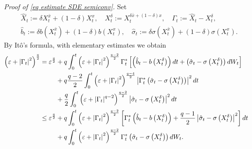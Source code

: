 \documentclass[11pt]{amsart}
\theoremstyle{plain}
\def \dd{{\rm d}}
\numberwithin{equation}{section}
\begin{document}
\smallbreak \noindent
\emph{Proof of \eqref{eq estimate SDE semiconv}.}
Set
$$
\begin{aligned}
& \hat{X}_{t}:=\delta X_{t}^{\bar{x}}+(1-\delta) X_{t}^{x}, \quad X_{t}^{\delta}:=X_{t}^{\delta \bar{x}+(1-\delta) x}, \quad \Gamma_{t}:=\hat{X}_{t}-X_{t}^{\delta}, \\
& \hat{b}_{t}:=\delta b\left(X_{t}^{\bar{x}}\right)+(1-\delta) b\left(X_{t}^{x}\right), \quad 
\hat{\sigma}_{t}:=\delta \sigma\left(X_{t}^{\bar{x}}\right)+(1-\delta) \sigma\left(X_{t}^{x}\right).
\end{aligned}
$$
By It\^o's formula, with elementary estimates we obtain 
$$
\begin{aligned}
\left(\varepsilon+\left|\Gamma_{t}\right|^{2}\right)^{\frac{q}{2}}=\varepsilon^{\frac{q}{2}} 
& 
+q\int_{0}^{t}\left(\varepsilon+\left|\Gamma_{t}\right|^{2}\right)^{\frac{q-2}{2}} \Gamma_{t}^{*}\left[\left(\hat{b}_{t}-b\left(X_t^\delta\right)\right) \dd t+\left(\hat{\sigma}_{t}-\sigma\left(X_t^\delta\right)\right) \dd W_{t}\right] \\
& +q \frac{q-2}{2} \int_{0}^{t}\left(\varepsilon+\left|\Gamma_{t}\right|^{2}\right)^{\frac{q-4}{2}}\left| \Gamma_{t}^* \left( \hat{\sigma}_{t}-\sigma\left(X_{t}^{\delta} \right) \right)\right|^{2} \dd t \\
& +\frac{q}{2} \int_{0}^{t}\left(\varepsilon+\left|\Gamma_{t}\right|^{q-2}\right)^{\frac{q-2}{2}}\left|\hat{\sigma}_{t}-\sigma\left(X_t^\delta\right)\right|^{2} \dd t \\
\leq \varepsilon^{\frac{q}{2}} & +q \int_{0}^{t}\left(\varepsilon+\left|\Gamma_{t}\right|^{2}\right)^{\frac{q-2}{2}}\left[\Gamma_{t}^{*}\left(\hat{b}_{t}-b\left(X_t^\delta\right)\right)+\frac{q-1}{2}\left|\hat{\sigma}_{t}-\sigma\left(X_{t}^{\delta}\right)\right|^{2}\right] \dd t \\
& +q \int_{0}^{t}\left(\varepsilon+\left|\Gamma_{t}\right|^2 \right)^{\frac{q-2}{2}} \Gamma_{t}^{*}\left(\hat{\sigma}_{t}-\sigma\left(X_{t}^{\delta}\right)\right) \dd W_{t}.
\end{aligned}
$$
\end{document}
